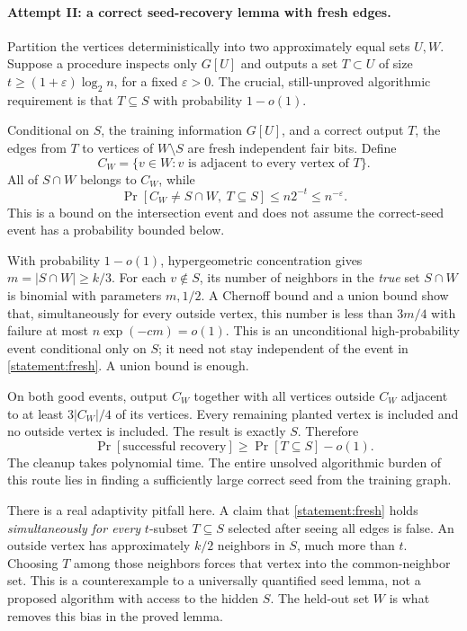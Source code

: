 \documentclass[11pt,a4paper]{article}
\numberwithin{equation}{section}
\begin{document}
\paragraph{Attempt II: a correct seed-recovery lemma with fresh edges.}
Partition the vertices deterministically into two approximately equal
sets $U,W$.  Suppose a procedure inspects only $G[U]$ and outputs a
set $T\subset U$ of size
$t\geq(1+\varepsilon)\log_2 n$, for a fixed $\varepsilon>0$.
The crucial, still-unproved algorithmic requirement is that
$T\subseteq S$ with probability $1-o(1)$.

Conditional on $S$, the training information $G[U]$, and a correct
output $T$, the edges from $T$ to vertices of $W\setminus S$ are
fresh independent fair bits.  Define
\[
 C_W=\{v\in W:v\text{ is adjacent to every vertex of }T\}.
\]
All of $S\cap W$ belongs to $C_W$, while
\begin{equation}\label{statement:fresh}
 \Pr[C_W\ne S\cap W,\ T\subseteq S]
 \leq n2^{-t}\leq n^{-\varepsilon}.
\end{equation}
This is a bound on the intersection event and does not assume the
correct-seed event has a probability bounded below.

With probability $1-o(1)$, hypergeometric concentration gives
$m=|S\cap W|\geq k/3$.  For each $v\notin S$, its number of neighbors
in the \emph{true} set $S\cap W$ is binomial with parameters $m,1/2$.
A Chernoff bound and a union bound show that, simultaneously for every
outside vertex, this number is less than $3m/4$ with failure at most
$n\exp(-c m)=o(1)$.  This is an unconditional high-probability event
conditional only on $S$; it need not stay independent of the event in
\eqref{statement:fresh}.  A union bound is enough.

On both good events, output $C_W$ together with all vertices outside
$C_W$ adjacent to at least $3|C_W|/4$ of its vertices.  Every remaining
planted vertex is included and no outside vertex is included.  The
result is exactly $S$.  Therefore
\begin{equation}\label{statement:seedrecovery}
 \Pr[\text{successful recovery}]
 \geq\Pr[T\subseteq S]-o(1).
\end{equation}
The cleanup takes polynomial time.  The entire unsolved algorithmic
burden of this route lies in finding a sufficiently large correct
seed from the training graph.

There is a real adaptivity pitfall here.  A claim that
\eqref{statement:fresh} holds \emph{simultaneously for every}
$t$-subset $T\subseteq S$ selected after seeing all edges is false.
An outside vertex has approximately $k/2$ neighbors in $S$, much more
than $t$.  Choosing $T$ among those neighbors forces that vertex into
the common-neighbor set.  This is a counterexample to a universally
quantified seed lemma, not a proposed algorithm with access to the
hidden $S$.  The held-out set $W$ is what removes this bias in the
proved lemma.
\end{document}
